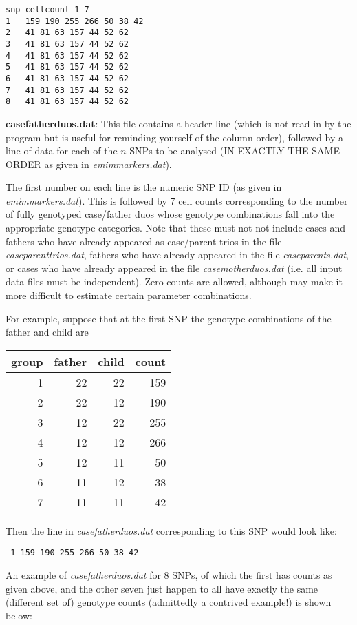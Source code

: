 \documentclass[a4paper,11pt]{report}
\begin{document}
\begin{verbatim}
snp	cellcount 1-7
1 	159 190 255 266 50 38 42
2 	41 81 63 157 44 52 62
3 	41 81 63 157 44 52 62
4 	41 81 63 157 44 52 62
5 	41 81 63 157 44 52 62
6 	41 81 63 157 44 52 62
7 	41 81 63 157 44 52 62
8 	41 81 63 157 44 52 62
\end{verbatim}
 
\bigskip

	{\bf  casefatherduos.dat}:  This file contains a header line
(which is not read in by the program but is useful for reminding
yourself of the  column order), followed by a line of data
for each of the $n$ SNPs to be analysed (IN EXACTLY THE SAME ORDER
as given in {\it emimmarkers.dat}).

The first number on each line is the numeric SNP ID (as given in {\it emimmarkers.dat}). This is followed by 7 cell counts corresponding to the number
of fully genotyped case/father duos whose genotype combinations 
fall into the appropriate genotype categories. Note that these
must not not include cases and fathers
who have already appeared as case/parent 
trios in the file {\it  caseparenttrios.dat}, fathers
who have already appeared in the file  {\it  caseparents.dat},
or cases who have already appeared in the file {\it  casemotherduos.dat} (i.e. all input data files must be
independent).
Zero counts are allowed, although
may make it more difficult to estimate certain parameter combinations.

For example, suppose that at the first SNP the genotype combinations of the father and child are

\begin{tabular}{rrrr} 
group    &   father &child   &count \\ \hline
1 &22 &22       &159\\
2 &22 &12       &190\\
3 &12 &22       &255\\
4 &12 &12       &266\\
5 &12 &11 &50\\
6 &11 &12 &38\\
7 &11 &11 &42\\
\end{tabular}

Then the line in	{\it  casefatherduos.dat} corresponding to this SNP 
would look like:

{\tt
1 	159 190 255 266 50 38 42
}

An example of {\it  casefatherduos.dat} for 8 SNPs, of which the first has counts as given above, and the other seven just happen to all have exactly the same (different set of) genotype counts (admittedly a contrived example!) is shown below:
\end{document}

